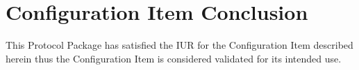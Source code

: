 \newpage
\section{Configuration Item Conclusion}
This Protocol Package has satisfied the IUR for the Configuration Item described
herein thus the Configuration Item is considered validated for its intended use.
